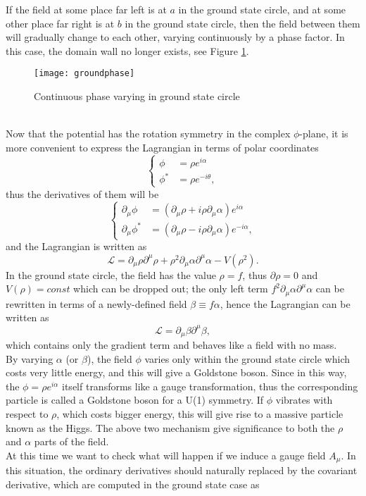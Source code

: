 \documentclass{article}
\newcommand{\be}{\begin{equation}}
\newcommand{\ee}{\end{equation}}
\newcommand{\p}{\partial}
\renewcommand{\1}{\left}
\renewcommand{\2}{\right}
\newcommand{\ma}{\mathcal}
\newcommand{\m}{\mu}
\newcommand{\al}{\alpha}
\newcommand{\bet}{\beta}
\renewcommand{\th}{\theta}
\begin{document}
If the field at some place far left is at $a$ in the ground state circle, and at some other place far right is at $b$ in the ground state circle, then the field between them will gradually change to each other, varying continuously by a phase factor. In this case, the domain wall no longer exists, see Figure \ref{gp}.
\begin{figure}[h]
\centering
\texttt{[image: groundphase]}
\caption{\label{gp}Continuous phase varying in ground state circle}
\end{figure}\\

Now that the potential has the rotation symmetry in the complex $\phi$-plane, it is more convenient to express the Lagrangian in terms of polar coordinates
\be\1\{\begin{split}
\phi&=\rho e^{i\al} \\
\phi^*&=\rho e^{-i\th},
\end{split}\2.\ee
thus the derivatives of them will be
\be\1\{\begin{split}
\p_\m\phi&=\1(\p_\m \rho+i\rho\p_\m\al\2)e^{i\al} \\
\p_\m\phi^*&=\1(\p_\m \rho-i\rho\p_\m\al\2)e^{-i\al},
\end{split}\2.\ee
and the Lagrangian is written as
\be
\ma L=\p_\m\rho\p^\m\rho+\rho^2\p_\m\al\p^\m\al-V(\rho^2).
\ee
In the ground state circle, the field has the value $\rho=f$, thus $\p\rho=0$ and $V(\rho)=const$ which can be dropped out; the only left term $f^2\p_\m\al\p^\m\al$ can be rewritten in terms of a newly-defined field $\bet\equiv f\al$, hence the Lagrangian can be written as
\be \ma L=\p_\m\bet\p^\m\bet, \ee
which contains only the gradient term and behaves like a field with no mass.\\
By varying $\al$ (or $\bet$), the field $\phi$ varies only within the ground state circle which costs very little energy, and this will give a Goldstone boson. Since in this way, the $\phi=\rho e^{i\al}$ itself transforms like a gauge transformation, thus the corresponding particle is called a Goldstone boson for a U(1) symmetry. If $\phi$ vibrates with respect to $\rho$, which costs bigger energy, this will give rise to a massive particle known as the Higgs. The above two mechanism give significance to  both the $\rho$ and $\al$ parts of the field.\\
At this time we want to check what will happen if we induce a gauge field $A_\m$. In this situation, the ordinary derivatives should naturally replaced by the covariant derivative, which are computed in the ground state case as
\end{document}
